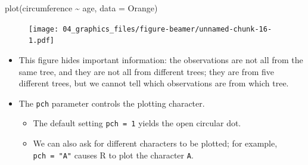 \documentclass[
  9pt,
  a4paper,
  ignorenonframetext,
  notheorems]{beamer}
\newenvironment{Shaded}{\begin{snugshade}}{\end{snugshade}}
\newcommand{\AttributeTok}[1]{\textcolor[rgb]{0.40,0.45,0.13}{#1}}
\newcommand{\FunctionTok}[1]{\textcolor[rgb]{0.28,0.35,0.67}{#1}}
\newcommand{\NormalTok}[1]{\textcolor[rgb]{0.00,0.23,0.31}{#1}}
\newcommand{\SpecialCharTok}[1]{\textcolor[rgb]{0.37,0.37,0.37}{#1}}
\providecommand{\tightlist}{%
  \setlength{\itemsep}{0pt}\setlength{\parskip}{0pt}}\usepackage{longtable,booktabs,array}
\begin{document}
\begin{frame}[fragile]
\begin{Shaded}
\begin{Highlighting}[]
\FunctionTok{plot}\NormalTok{(circumference }\SpecialCharTok{\textasciitilde{}}\NormalTok{ age, }\AttributeTok{data =}\NormalTok{ Orange)}
\end{Highlighting}
\end{Shaded}

\begin{figure}

{\centering \texttt{[image: 04\_graphics\_files/figure-beamer/unnamed-chunk-16-1.pdf]}

}

\end{figure}

\begin{itemize}
\tightlist
\item
  This figure hides important information: the observations are not all
  from the same tree, and they are not all from different trees; they
  are from five different trees, but we cannot tell which observations
  are from which tree.
\end{itemize}

\begin{itemize}
\tightlist
\item
  The \texttt{pch} parameter controls the plotting character.

  \begin{itemize}
  \tightlist
  \item
    The default setting \texttt{pch\ =\ 1} yields the open circular dot.
  \item
    We can also ask for different characters to be plotted; for example,
    \texttt{pch\ =\ "A"} causes R to plot the character \texttt{A}.
  \end{itemize}
\end{itemize}
\end{frame}
\end{document}
